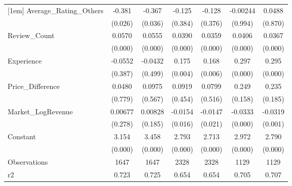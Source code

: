 {\begin{tabular}{l*{6}{c}}
[1em]
Average\_Rating\_Others&      -0.381\sym{*}  &      -0.367\sym{*}  &      -0.125         &      -0.128         &    -0.00244         &      0.0488         \\
                    &     (0.026)         &     (0.036)         &     (0.384)         &     (0.376)         &     (0.994)         &     (0.870)         \\
[1em]
Review\_Count        &      0.0570\sym{***}&      0.0555\sym{***}&      0.0390\sym{***}&      0.0359\sym{***}&      0.0406\sym{***}&      0.0367\sym{***}\\
                    &     (0.000)         &     (0.000)         &     (0.000)         &     (0.000)         &     (0.000)         &     (0.000)         \\
[1em]
Experience          &     -0.0552         &     -0.0432         &       0.175\sym{**} &       0.168\sym{**} &       0.297\sym{***}&       0.295\sym{***}\\
                    &     (0.387)         &     (0.499)         &     (0.004)         &     (0.006)         &     (0.000)         &     (0.000)         \\
[1em]
Price\_Difference    &      0.0480         &      0.0975         &      0.0919         &      0.0799         &       0.249         &       0.235         \\
                    &     (0.779)         &     (0.567)         &     (0.454)         &     (0.516)         &     (0.158)         &     (0.185)         \\
[1em]
Market\_LogRevenue   &     0.00677         &     0.00828         &     -0.0154\sym{*}  &     -0.0147\sym{*}  &     -0.0333\sym{***}&     -0.0319\sym{***}\\
                    &     (0.278)         &     (0.185)         &     (0.016)         &     (0.021)         &     (0.000)         &     (0.001)         \\
[1em]
Constant            &       3.154\sym{***}&       3.458\sym{***}&       2.793\sym{***}&       2.713\sym{***}&       2.972\sym{***}&       2.790\sym{***}\\
                    &     (0.000)         &     (0.000)         &     (0.000)         &     (0.000)         &     (0.000)         &     (0.000)         \\
\hline
Observations        &        1647         &        1647         &        2328         &        2328         &        1129         &        1129         \\
r2                  &       0.723         &       0.725         &       0.654         &       0.654         &       0.705         &       0.707         \\

\end{tabular}}
